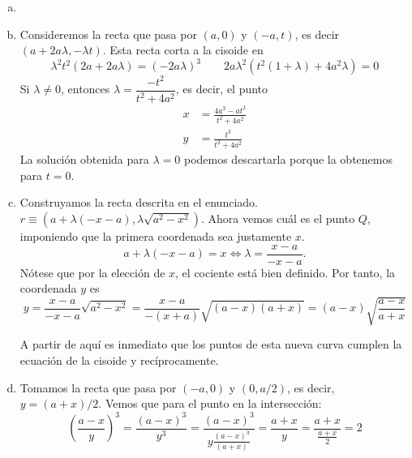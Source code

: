 \documentclass[twoside]{article}
\begin{document}
\begin{solucion}
\begin{enumerate}[a.]
\item[]
\item Consideremos la recta que pasa por $(a,0)$ y $(-a,t)$, es decir $(a+2a\lambda,-\lambda t)$. Esta recta corta a la cisoide en
$$
\lambda^2t^2(2a+2a\lambda)=(-2a\lambda)^3 \qquad 2a\lambda^2(t^2(1+\lambda)+4a^2\lambda)=0
$$
Si $\lambda \neq 0$, entonces $\lambda = \dfrac{-t^2}{t^2+4a^2}$, es decir, el punto 
\begin{align*}
x&=\frac{4a^3-at^2}{t^2+4a^2}\\
y&=\frac{t^3}{t^2+4a^2}
\end{align*}
La solución obtenida para $\lambda = 0$ podemos descartarla porque la obtenemos para $t=0$.
\item  Construyamos la recta descrita en el enunciado. $r\equiv (a+\lambda (-x-a),\lambda\sqrt{a^2-x^2})$. Ahora vemos cuál es el punto $Q$, imponiendo que la primera coordenada sea justamente $x$.
\[
a+\lambda (-x-a)=x\Leftrightarrow \lambda=\frac{x-a}{-x-a}.
\]
Nótese que por la elección de $x$, el cociente está bien definido. Por tanto, la coordenada $y$ es
\[
y=\frac{x-a}{-x-a}\sqrt{a^2-x^2}=\frac{x-a}{-(x+a)}\sqrt{(a-x)(a+x)}=(a-x)\sqrt{\frac{a-x}{a+x}}
\]

A partir de aquí es inmediato que los puntos de esta nueva curva cumplen la ecuación de la cisoide y recíprocamente.

\item Tomamos la recta que pasa por $(-a,0)$ y $(0,a/2)$, es decir, $y=(a+x)/2$. Vemos que para el punto en la intersección:
\[ \left(\frac{a-x}{y}\right)^3 = \frac{(a-x)^3}{y^3} = \frac{(a-x)^3}{y\frac{(a-x)^3}{(a+x)}} = \frac{a+x}{y} = \frac{a+x}{\frac{a+x}{2}} = 2 \]
\end{enumerate}
\end{solucion}

\newpage
\end{document}

